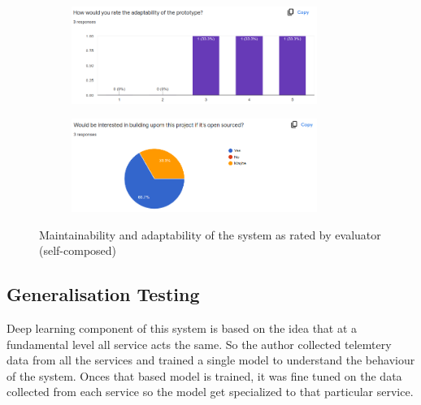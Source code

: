 \begin{figure}[H]
    \centering
    \begin{subfigure}[bH]{0.49\textwidth}
        \centering
        \includegraphics[width=8cm]{assets/testing/adaptability.png}
    \end{subfigure}
    \hfill
    \begin{subfigure}[bH]{0.49\textwidth}
        \centering
        \includegraphics[width=8cm]{assets/testing/build-uporn.png}
    \end{subfigure}
    \hfill
    \caption{Maintainability and adaptability of the system as rated by evaluator (self-composed)}
\end{figure}


\subsection{Generalisation Testing}

Deep learning component of this system is based on the idea that at a fundamental level all service acts the same. So the author collected telemtery data from all the services and trained a single model to understand the  behaviour of the system. Onces that based model is trained, it was fine tuned on the data collected from each service so the model get specialized to that particular service.

